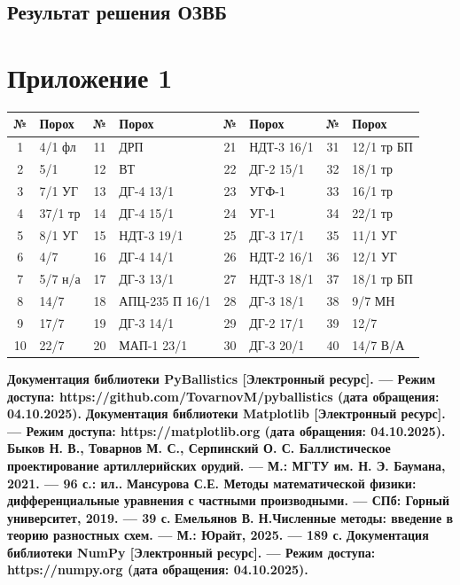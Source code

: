 \documentclass[14pt, a4paper]{extreport} %
\begin{document}
\section{Результат решения ОЗВБ}


\chapter*{Приложение 1}

\begin{table}[h]
\centering
\begin{tabular}{|c|l|c|l|c|l|c|l|}
\hline
\textbf{№} & \textbf{Порох} & \textbf{№} & \textbf{Порох} & \textbf{№} & \textbf{Порох} & \textbf{№} & \textbf{Порох} \\
\hline
1 & 4/1 фл & 11 & ДРП & 21 & НДТ-3 16/1 & 31 & 12/1 тр БП \\
\hline
2 & 5/1 & 12 & ВТ & 22 & ДГ-2 15/1 & 32 & 18/1 тр \\
\hline
3 & 7/1 УГ & 13 & ДГ-4 13/1 & 23 & УГФ-1 & 33 & 16/1 тр \\
\hline
4 & 37/1 тр & 14 & ДГ-4 15/1 & 24 & УГ-1 & 34 & 22/1 тр \\
\hline
5 & 8/1 УГ & 15 & НДТ-3 19/1 & 25 & ДГ-3 17/1 & 35 & 11/1 УГ \\
\hline
6 & 4/7 & 16 & ДГ-4 14/1 & 26 & НДТ-2 16/1 & 36 & 12/1 УГ \\
\hline
7 & 5/7 н/а & 17 & ДГ-3 13/1 & 27 & НДТ-3 18/1 & 37 & 18/1 тр БП \\
\hline
8 & 14/7 & 18 & АПЦ-235 П 16/1 & 28 & ДГ-3 18/1 & 38 & 9/7 МН \\
\hline
9 & 17/7 & 19 & ДГ-3 14/1 & 29 & ДГ-2 17/1 & 39 & 12/7 \\
\hline
10 & 22/7 & 20 & МАП-1 23/1 & 30 & ДГ-3 20/1 & 40 & 14/7 В/А \\
\hline
\end{tabular}
\end{table}

\newpage
\begin{thebibliography}{9}
\bibitem{} \textbf{Документация библиотеки PyBallistics [Электронный ресурс]. — Режим доступа: https://github.com/TovarnovM/pyballistics (дата обращения: 04.10.2025).}
\bibitem{} \textbf{Документация библиотеки Matplotlib [Электронный ресурс]. — Режим доступа: https://matplotlib.org (дата обращения: 04.10.2025).} 
\bibitem{} \textbf{
Быков Н. В., Товарнов М. С., Серпинский О. С. Баллистическое проектирование артиллерийских орудий. — М.: МГТУ им. Н. Э. Баумана, 2021. — 96 с.: ил..} 
\bibitem{} \textbf{Мансурова С.Е. Методы математической физики: дифференциальные уравнения с частными производными. — СПб: Горный университет, 2019. — 39 с.} 
\bibitem{} \textbf{Емельянов В. Н.Численные методы: введение в теорию разностных схем. — М.: Юрайт, 2025. — 189 с.} 
\bibitem{} \textbf{Документация библиотеки NumPy [Электронный ресурс]. — Режим доступа: https://numpy.org (дата обращения: 04.10.2025).}
\end{thebibliography}
\end{document}
